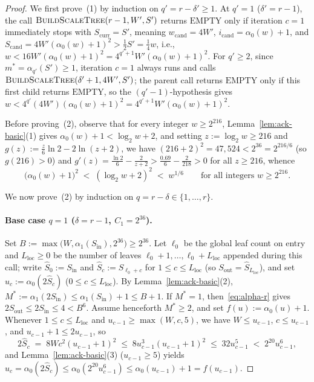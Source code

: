 \documentclass[11pt]{article}
\theoremstyle{definition}
\theoremstyle{remark}
\newcommand{\BuildScaleTree}{\textnormal{\scshape BuildScaleTree}}
\begin{document}
\begin{proof}
We first prove~(1) by induction on $q' = r - \delta' \ge 1$. At $q' = 1$ ($\delta' = r - 1$), the call $\BuildScaleTree(r - 1, W', S')$ returns $\mathrm{EMPTY}$ only if iteration $c = 1$ immediately stops with $S_{\mathrm{curr}} = S'$, meaning $w_{\mathrm{cand}} = 4 W'$, $i_{\mathrm{cand}} = \alpha_0(w) + 1$, and $S_{\mathrm{cand}} = 4 W' (\alpha_0(w) + 1)^2 > \frac{1}{2} S' = \frac{1}{4} w$, i.e., $w < 16 W' (\alpha_0(w) + 1)^2 = 4^{q'+1} W' (\alpha_0(w) + 1)^2$. For $q' \ge 2$, since $m^* = \alpha_{q'}(S') \ge 1$, iteration $c = 1$ always runs and calls $\BuildScaleTree(\delta' + 1, 4 W', S')$; the parent call returns $\mathrm{EMPTY}$ only if this first child returns $\mathrm{EMPTY}$, so the $(q' - 1)$-hypothesis gives $w < 4^{q'} (4 W') (\alpha_0(w) + 1)^2 = 4^{q'+1} W' (\alpha_0(w) + 1)^2$.

Before proving~(2), observe that for every integer $w \ge 2^{216}$, Lemma~\ref{lem:ack-basic}(1) gives $\alpha_0(w) + 1 < \log_2 w + 2$, and setting $z := \log_2 w \ge 216$ and $g(z) := \frac{z}{6}\ln 2 - 2\ln(z + 2)$, we have $(216 + 2)^2 = 47{,}524 < 2^{36} = 2^{216/6}$ (so $g(216) > 0$) and $g'(z) = \frac{\ln 2}{6} - \frac{2}{z + 2} > \frac{0.69}{6} - \frac{2}{218} > 0$ for all $z \ge 216$, whence
\begin{equation}
\label{eq:log-sixth-power}
\big(\alpha_0(w) + 1\big)^2 \;<\; (\log_2 w + 2)^2 \;<\; w^{1/6}
\qquad \text{for all integers } w \ge 2^{216}.
\end{equation}

We now prove~(2) by induction on $q = r - \delta \in \{1, \dots, r\}$.

\paragraph{Base case $q = 1$ ($\delta = r - 1$, $C_1 = 2^{36}$).}
Set $B := \max\big(W, \alpha_1(S_{\mathrm{in}}), 2^{36}\big) \ge 2^{36}$. Let $\ell_0$ be the global leaf count on entry and $L_{\mathrm{loc}} \ge 0$ be the number of leaves $\ell_0 + 1, \dots, \ell_0 + L_{\mathrm{loc}}$ appended during this call; write $\widehat{S}_0 := S_{\mathrm{in}}$ and $\widehat{S}_c := S_{\ell_0 + c}$ for $1 \le c \le L_{\mathrm{loc}}$ (so $S_{\mathrm{out}} = \widehat{S}_{L_{\mathrm{loc}}}$), and set $u_c := \alpha_0(2 \widehat{S}_c)$ ($0 \le c \le L_{\mathrm{loc}}$). By Lemma~\ref{lem:ack-basic}(2), $M^* := \alpha_1(2 S_{\mathrm{in}}) \le \alpha_1(S_{\mathrm{in}}) + 1 \le B + 1$. If $M^* = 1$, then~\eqref{eq:alpha-r} gives $2 S_{\mathrm{out}} \le 2 S_{\mathrm{in}} \le 4 < B^6$. Assume henceforth $M^* \ge 2$, and set $f(u) := \alpha_0(u) + 1$. Whenever $1 \le c \le L_{\mathrm{loc}}$ and $u_{c-1} \ge \max(W, c, 5)$, we have $W \le u_{c-1}$, $c \le u_{c-1}$, and $u_{c-1} + 1 \le 2 u_{c-1}$, so
\[
2 \widehat{S}_c \;=\; 8 W c^2 (u_{c-1} + 1)^2 \;\le\; 8 u_{c-1}^3 (u_{c-1} + 1)^2 \;\le\; 32 u_{c-1}^5 \;<\; 2^{20} u_{c-1}^6,
\]
and Lemma~\ref{lem:ack-basic}(3) ($u_{c-1} \ge 5$) yields $u_c = \alpha_0(2 \widehat{S}_c) \le \alpha_0(2^{20} u_{c-1}^6) \le \alpha_0(u_{c-1}) + 1 = f(u_{c-1})$.


\end{proof}
\end{document}
